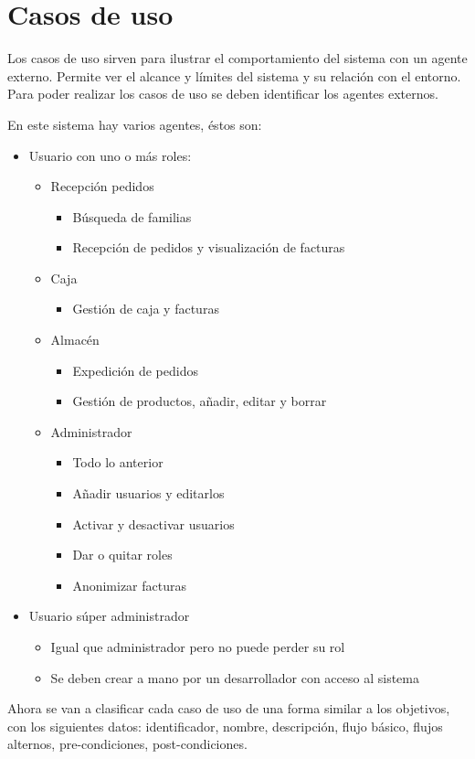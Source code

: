 \section{Casos de uso}
Los casos de uso sirven para ilustrar el comportamiento del sistema con un agente externo. Permite ver el alcance y límites del sistema y su relación con el entorno. Para poder realizar los casos de uso se deben identificar los agentes externos.
\vspace{1em}
\par En este sistema hay varios agentes, éstos son:
\begin{itemize}
    \item Usuario con uno o más roles:
    \begin{itemize}
        \item Recepción pedidos
        \begin{itemize}
            \item Búsqueda de familias
            \item Recepción de pedidos y visualización de facturas
        \end{itemize}
        \item Caja
        \begin{itemize}
            \item Gestión de caja y facturas
        \end{itemize}
        \item Almacén
        \begin{itemize}
            \item Expedición de pedidos
            \item Gestión de productos, añadir, editar y borrar
        \end{itemize}
        \item Administrador
        \begin{itemize}
            \item Todo lo anterior
            \item Añadir usuarios y editarlos
            \item Activar y desactivar usuarios
            \item Dar o quitar roles
            \item Anonimizar facturas
        \end{itemize}
    \end{itemize}
    \item Usuario súper administrador
    \begin{itemize}
        \item Igual que administrador pero no puede perder su rol
        \item Se deben crear a mano por un desarrollador con acceso al sistema
    \end{itemize}
\end{itemize}
\clearpage
Ahora se van a clasificar cada caso de uso de una forma similar a los objetivos, con los siguientes datos: identificador, nombre, descripción, flujo básico, flujos alternos, pre-condiciones, post-condiciones.

